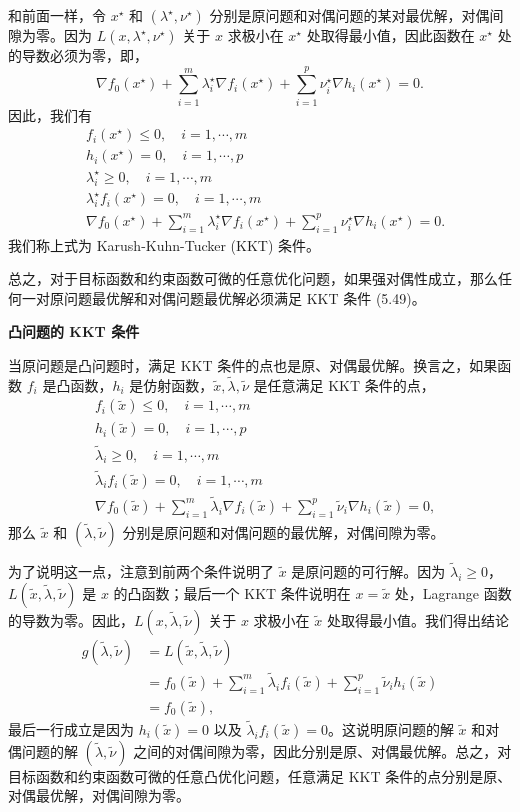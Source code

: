 \documentclass[UTF8, 12pt, fontset=fandol, oneside]{ctexart}
\begin{document}
和前面一样，令 $x^\star$ 和 $(\lambda^\star,\nu^\star)$ 分别是原问题和对偶问题的某对最优解，对偶间隙为零。因为 $L(x,\lambda^\star,\nu^\star)$ 关于 $x$ 求极小在 $x^\star$ 处取得最小值，因此函数在 $x^\star$ 处的导数必须为零，即，
\[
\nabla f_0(x^\star)+\sum_{i=1}^m\lambda_i^\star\nabla f_i(x^\star)+\sum_{i=1}^p\nu_i^\star\nabla h_i(x^\star)=0.
\]
因此，我们有
\begin{equation}
\begin{aligned}
& f_i(x^\star)\leq 0,\quad i=1,\cdots,m\\
& h_i(x^\star)=0,\quad i=1,\cdots,p\\
& \lambda_i^\star\geq 0,\quad i=1,\cdots,m\\
& \lambda_i^\star f_i(x^\star)=0,\quad i=1,\cdots,m\\
& \nabla f_0(x^\star)+\sum_{i=1}^m\lambda_i^\star\nabla f_i(x^\star)+\sum_{i=1}^p\nu_i^\star\nabla h_i(x^\star)=0.
\end{aligned}
\tag{5.49}
\end{equation}
我们称上式为 Karush-Kuhn-Tucker (KKT) 条件。

总之，对于目标函数和约束函数可微的任意优化问题，如果强对偶性成立，那么任何一对原问题最优解和对偶问题最优解必须满足 KKT 条件 (5.49)。

\noindent\textbf{凸问题的 KKT 条件}

当原问题是凸问题时，满足 KKT 条件的点也是原、对偶最优解。换言之，如果函数 $f_i$ 是凸函数，$h_i$ 是仿射函数，$\tilde{x},\tilde{\lambda},\tilde{\nu}$ 是任意满足 KKT 条件的点，
\[
\begin{aligned}
& f_i(\tilde{x})\leq 0,\quad i=1,\cdots,m\\
& h_i(\tilde{x})=0,\quad i=1,\cdots,p\\
& \tilde{\lambda}_i\geq 0,\quad i=1,\cdots,m\\
& \tilde{\lambda}_i f_i(\tilde{x})=0,\quad i=1,\cdots,m\\
& \nabla f_0(\tilde{x})+\sum_{i=1}^m\tilde{\lambda}_i\nabla f_i(\tilde{x})+\sum_{i=1}^p\tilde{\nu}_i\nabla h_i(\tilde{x})=0,
\end{aligned}
\]
那么 $\tilde{x}$ 和 $(\tilde{\lambda},\tilde{\nu})$ 分别是原问题和对偶问题的最优解，对偶间隙为零。

为了说明这一点，注意到前两个条件说明了 $\tilde{x}$ 是原问题的可行解。因为 $\tilde{\lambda}_i\geq 0$，$L(\tilde{x},\tilde{\lambda},\tilde{\nu})$ 是 $x$ 的凸函数；最后一个 KKT 条件说明在 $x=\tilde{x}$ 处，Lagrange 函数的导数为零。因此，$L(x,\tilde{\lambda},\tilde{\nu})$ 关于 $x$ 求极小在 $\tilde{x}$ 处取得最小值。我们得出结论
\[
\begin{aligned}
g(\tilde{\lambda},\tilde{\nu})
&=L(\tilde{x},\tilde{\lambda},\tilde{\nu})\\
&=f_0(\tilde{x})+\sum_{i=1}^m\tilde{\lambda}_i f_i(\tilde{x})+\sum_{i=1}^p\tilde{\nu}_i h_i(\tilde{x})\\
&=f_0(\tilde{x}),
\end{aligned}
\]
最后一行成立是因为 $h_i(\tilde{x})=0$ 以及 $\tilde{\lambda}_i f_i(\tilde{x})=0$。这说明原问题的解 $\tilde{x}$ 和对偶问题的解 $(\tilde{\lambda},\tilde{\nu})$ 之间的对偶间隙为零，因此分别是原、对偶最优解。总之，对目标函数和约束函数可微的任意凸优化问题，任意满足 KKT 条件的点分别是原、对偶最优解，对偶间隙为零。
\end{document}
